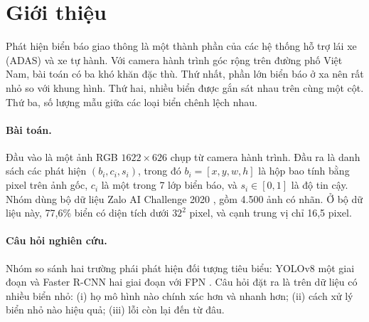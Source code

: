 
\section{Giới thiệu}
\label{sec:intro}

Phát hiện biển báo giao thông là một thành phần của các hệ thống hỗ trợ lái xe (ADAS) và xe tự hành.
Với camera hành trình góc rộng trên đường phố Việt Nam, bài toán có ba khó khăn đặc thù.
Thứ nhất, phần lớn biển báo ở xa nên rất nhỏ so với khung hình.
Thứ hai, nhiều biển được gắn sát nhau trên cùng một cột.
Thứ ba, số lượng mẫu giữa các loại biển chênh lệch nhau.

\paragraph{Bài toán.}
Đầu vào là một ảnh RGB $1622 \times 626$ chụp từ camera hành trình.
Đầu ra là danh sách các phát hiện $(b_i, c_i, s_i)$, trong đó $b_i = [x, y, w, h]$ là hộp bao tính bằng pixel trên ảnh gốc, $c_i$ là một trong 7 lớp biển báo, và $s_i \in [0, 1]$ là độ tin cậy.
Nhóm dùng bộ dữ liệu Zalo AI Challenge 2020 \citep{zalo2020traffic}, gồm 4.500 ảnh có nhãn.
Ở bộ dữ liệu này, 77,6\% biển có diện tích dưới $32^2$ pixel, và cạnh trung vị chỉ 16,5 pixel.

\paragraph{Câu hỏi nghiên cứu.}
Nhóm so sánh hai trường phái phát hiện đối tượng tiêu biểu: YOLOv8 một giai đoạn \citep{jocher2023ultralytics} và Faster R-CNN hai giai đoạn với FPN \citep{ren2015faster,lin2017fpn}.
Câu hỏi đặt ra là trên dữ liệu có nhiều biển nhỏ: (i) họ mô hình nào chính xác hơn và nhanh hơn; (ii) cách xử lý biển nhỏ nào hiệu quả; (iii) lỗi còn lại đến từ đâu.

